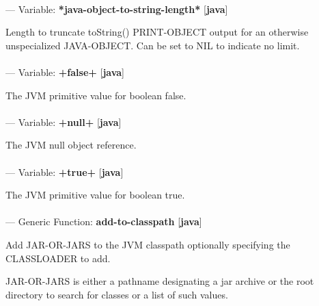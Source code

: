 \paragraph{}
\label{JAVA:*JAVA-OBJECT-TO-STRING-LENGTH*}
--- Variable: \textbf{*java-object-to-string-length*} [\textbf{java}] \textit{}

\begin{adjustwidth}{5em}{5em}
Length to truncate toString() PRINT-OBJECT output for an otherwise unspecialized JAVA-OBJECT.  Can be set to NIL to indicate no limit.
\end{adjustwidth}

\paragraph{}
\label{JAVA:+FALSE+}
--- Variable: \textbf{+false+} [\textbf{java}] \textit{}

\begin{adjustwidth}{5em}{5em}
The JVM primitive value for boolean false.
\end{adjustwidth}

\paragraph{}
\label{JAVA:+NULL+}
--- Variable: \textbf{+null+} [\textbf{java}] \textit{}

\begin{adjustwidth}{5em}{5em}
The JVM null object reference.
\end{adjustwidth}

\paragraph{}
\label{JAVA:+TRUE+}
--- Variable: \textbf{+true+} [\textbf{java}] \textit{}

\begin{adjustwidth}{5em}{5em}
The JVM primitive value for boolean true.
\end{adjustwidth}

\paragraph{}
\label{JAVA:ADD-TO-CLASSPATH}
--- Generic Function: \textbf{add-to-classpath} [\textbf{java}] \textit{}

\begin{adjustwidth}{5em}{5em}
Add JAR-OR-JARS to the JVM classpath optionally specifying the CLASSLOADER to add.

JAR-OR-JARS is either a pathname designating a jar archive or the root
directory to search for classes or a list of such values.
\end{adjustwidth}

